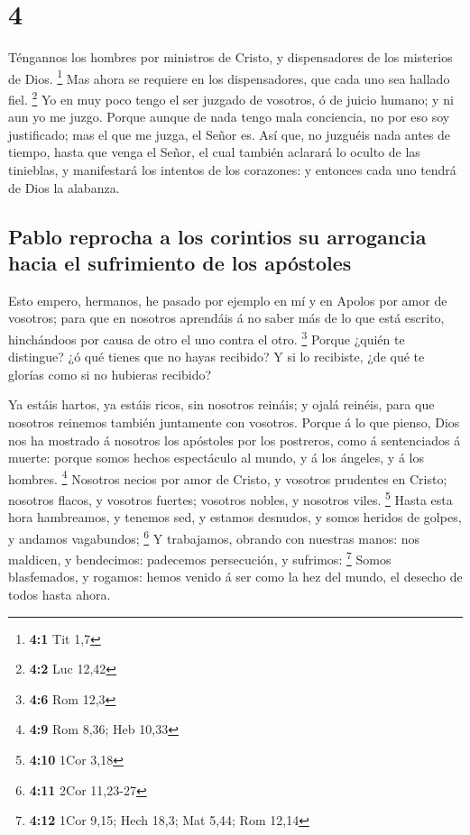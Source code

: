 \hypertarget{section-3}{%
\section{4}\label{section-3}}

 Téngannos los hombres por ministros de Cristo, y
dispensadores de los misterios de Dios. \footnote{\textbf{4:1} Tit 1,7}
 Mas ahora se requiere en los dispensadores, que cada uno
sea hallado fiel. \footnote{\textbf{4:2} Luc 12,42}  Yo en
muy poco tengo el ser juzgado de vosotros, ó de juicio humano; y ni aun
yo me juzgo.  Porque aunque de nada tengo mala conciencia,
no por eso soy justificado; mas el que me juzga, el Señor es.
 Así que, no juzguéis nada antes de tiempo, hasta que venga
el Señor, el cual también aclarará lo oculto de las tinieblas, y
manifestará los intentos de los corazones: y entonces cada uno tendrá de
Dios la alabanza.

\hypertarget{pablo-reprocha-a-los-corintios-su-arrogancia-hacia-el-sufrimiento-de-los-apuxf3stoles}{%
\subsection{Pablo reprocha a los corintios su arrogancia hacia el
sufrimiento de los
apóstoles}\label{pablo-reprocha-a-los-corintios-su-arrogancia-hacia-el-sufrimiento-de-los-apuxf3stoles}}

 Esto empero, hermanos, he pasado por ejemplo en mí y en
Apolos por amor de vosotros; para que en nosotros aprendáis á no saber
más de lo que está escrito, hinchándoos por causa de otro el uno contra
el otro. \footnote{\textbf{4:6} Rom 12,3}  Porque ¿quién te
distingue? ¿ó qué tienes que no hayas recibido? Y si lo recibiste, ¿de
qué te glorías como si no hubieras recibido?

 Ya estáis hartos, ya estáis ricos, sin nosotros reináis; y
ojalá reinéis, para que nosotros reinemos también juntamente con
vosotros.  Porque á lo que pienso, Dios nos ha mostrado á
nosotros los apóstoles por los postreros, como á sentenciados á muerte:
porque somos hechos espectáculo al mundo, y á los ángeles, y á los
hombres. \footnote{\textbf{4:9} Rom 8,36; Heb 10,33} 
Nosotros necios por amor de Cristo, y vosotros prudentes en Cristo;
nosotros flacos, y vosotros fuertes; vosotros nobles, y nosotros viles.
\footnote{\textbf{4:10} 1Cor 3,18}  Hasta esta hora
hambreamos, y tenemos sed, y estamos desnudos, y somos heridos de
golpes, y andamos vagabundos; \footnote{\textbf{4:11} 2Cor 11,23-27}
 Y trabajamos, obrando con nuestras manos: nos maldicen, y
bendecimos: padecemos persecución, y sufrimos: \footnote{\textbf{4:12}
  1Cor 9,15; Hech 18,3; Mat 5,44; Rom 12,14}  Somos
blasfemados, y rogamos: hemos venido á ser como la hez del mundo, el
desecho de todos hasta ahora.

